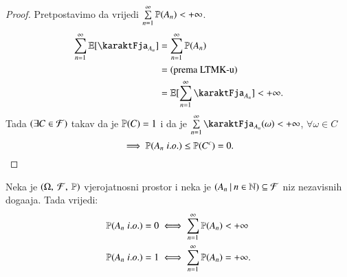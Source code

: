 \begin{proof}
    Pretpostavimo da vrijedi
    $\sum\limits_{n = 1}^{\infty} \mathbb{P}({A_n}) < +\infty$.
    \begin{equation*}
        \begin{aligned}
            \suma{n = 1}{\infty} \masE [ \karaktFja_{A_n} ] &= \suma{n = 1}{\infty} \vjeroj{A_n}\\
            &= (\textnormal{prema LTMK-u})\\
            &= \masE [\suma{n = 1}{\infty} \karaktFja_{A_n}] < +\infty.
        \end{aligned}
    \end{equation*}
    Tada $(\exists C \in \mathcal{F})$ takav da je $\mathbb{P}({C}) = 1$ i da je $\suma{n = 1}{\infty} \karaktFja_{A_n}(\omega) < +\infty$, $\forall \omega \in C$
    \begin{equation*}
        \implies \mathbb{P}({A_n \; i.o.}) \leq \mathbb{P}({C^c}) = 0. 
    \end{equation*}
\end{proof}

\begin{tm}   \label{tm:9.3}
    Neka je $(\Omega, \: \mathcal{F}, \: \mathbb{P})$ vjerojatnosni prostor i neka je $({A_n} \: | \: {n \in \mathbb{N}}) \subseteq \mathcal{F}$ niz nezavisnih doga\dj aja.
    Tada vrijedi:
    \begin{equation*}
        \begin{aligned}
            \mathbb{P}({A_n \; i.o.}) = 0 &\iff \sum\limits_{n = 1}^{\infty} \mathbb{P}({A_n}) < +\infty\\
            \mathbb{P}({A_n \; i.o.}) = 1 &\iff \sum\limits_{n = 1}^{\infty} \mathbb{P}({A_n}) = +\infty.
        \end{aligned}
    \end{equation*}
\end{tm}

